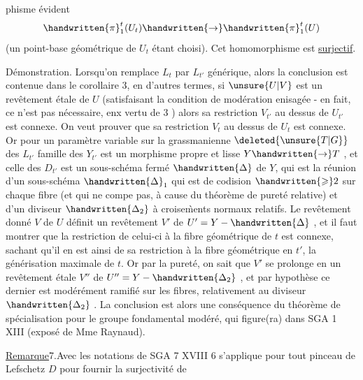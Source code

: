%
phisme évident
\reversemarginpar
{}
\normalmarginpar
\[
\handwritten{\pi}_1^t(U_t)\handwritten{\rightarrow}\handwritten{\pi}_1^t(U)
\]
(un point-base géométrique de $U_t$ étant choisi). Cet homomorphisme est \uline{surjectif}.

Démonstration. Lorsqu'on remplace $L_t$ par $L_{t'}$ générique, alors la conclusion est contenue dans le corollaire 3, en d'autres termes, si $\unsure{U|V}$ est un revêtement étale  de $U$  (satisfaisant la condition de modération enisagée - en fait, ce n'est pas nécessaire, enx vertu de 3 ) alors sa restriction $V_{t'}$ au dessus de $U_{t'}$ est connexe. On veut prouver que sa restriction $V_t$ au dessus de $U_t$ est  connexe. Or pour un paramètre variable sur  la grassmanienne $\deleted{\unsure{T|G}}$ des $L_{t'}$\handwritten{,}   famille des $Y_{t'}$ est un morphisme propre et lisse $Y\handwritten{\rightarrow}T$ , et celle des $D_{t'}$ est un sous-schéma fermé  $\handwritten{\Delta}$ de $Y$, qui est la réunion d'un sous-schéma $\handwritten{\Delta}_1$ qui est de codision $\handwritten{\geqslant}2$ sur chaque fibre (et qui ne compe pas, à cause du théorème de pureté relative) et d'un diviseur $\handwritten{\Delta_2}$ à croise\`{m}ents normaux relatifs. Le revêtement donné $V$ de $U$ définit un revêtement  $V'$ de $U'=Y-\handwritten{\Delta}$ , et il faut montrer que la restriction de celui-ci à la fibre géométrique de $t$ est connexe, sachant qu'il en est ainsi de sa restriction à la fibre géométrique en  $t'$, la générisation maximale de $t$. Or par la pureté, on sait que $V'$ se prolonge en un revêtement étale $V''$ de $U''=Y-\handwritten{\Delta_2}$ , et par hypothèse ce dernier est modérément ramifié sur les fibres, relativement au diviseur $\handwritten{\Delta_2}$ . La conclusion est alors une conséquence du théorème  de spécialisation pour le groupe fondamental modéré, qui figure(ra) dans SGA 1 XIII (exposé de Mme Raynaud).

\uline{Remarque}7.Avec les notations de SGA 7 XVIII\handwritten{,} 6 s'applique pour tout pinceau de Lefschetz $D$ pour fournir la surjectivité de
